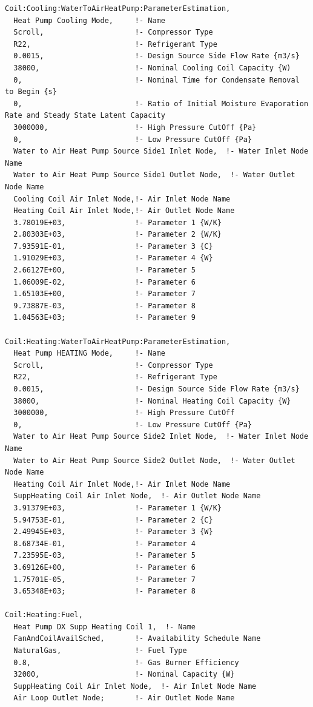 \begin{lstlisting}
Coil:Cooling:WaterToAirHeatPump:ParameterEstimation,
  Heat Pump Cooling Mode,     !- Name
  Scroll,                     !- Compressor Type
  R22,                        !- Refrigerant Type
  0.0015,                     !- Design Source Side Flow Rate {m3/s}
  38000,                      !- Nominal Cooling Coil Capacity {W)
  0,                          !- Nominal Time for Condensate Removal to Begin {s}
  0,                          !- Ratio of Initial Moisture Evaporation Rate and Steady State Latent Capacity
  3000000,                    !- High Pressure CutOff {Pa}
  0,                          !- Low Pressure CutOff {Pa}
  Water to Air Heat Pump Source Side1 Inlet Node,  !- Water Inlet Node Name
  Water to Air Heat Pump Source Side1 Outlet Node,  !- Water Outlet Node Name
  Cooling Coil Air Inlet Node,!- Air Inlet Node Name
  Heating Coil Air Inlet Node,!- Air Outlet Node Name
  3.78019E+03,                !- Parameter 1 {W/K}
  2.80303E+03,                !- Parameter 2 {W/K}
  7.93591E-01,                !- Parameter 3 {C}
  1.91029E+03,                !- Parameter 4 {W}
  2.66127E+00,                !- Parameter 5
  1.06009E-02,                !- Parameter 6
  1.65103E+00,                !- Parameter 7
  9.73887E-03,                !- Parameter 8
  1.04563E+03;                !- Parameter 9

Coil:Heating:WaterToAirHeatPump:ParameterEstimation,
  Heat Pump HEATING Mode,     !- Name
  Scroll,                     !- Compressor Type
  R22,                        !- Refrigerant Type
  0.0015,                     !- Design Source Side Flow Rate {m3/s}
  38000,                      !- Nominal Heating Coil Capacity {W}
  3000000,                    !- High Pressure CutOff
  0,                          !- Low Pressure CutOff {Pa}
  Water to Air Heat Pump Source Side2 Inlet Node,  !- Water Inlet Node Name
  Water to Air Heat Pump Source Side2 Outlet Node,  !- Water Outlet Node Name
  Heating Coil Air Inlet Node,!- Air Inlet Node Name
  SuppHeating Coil Air Inlet Node,  !- Air Outlet Node Name
  3.91379E+03,                !- Parameter 1 {W/K}
  5.94753E-01,                !- Parameter 2 {C}
  2.49945E+03,                !- Parameter 3 {W}
  8.68734E-01,                !- Parameter 4
  7.23595E-03,                !- Parameter 5
  3.69126E+00,                !- Parameter 6
  1.75701E-05,                !- Parameter 7
  3.65348E+03;                !- Parameter 8

Coil:Heating:Fuel,
  Heat Pump DX Supp Heating Coil 1,  !- Name
  FanAndCoilAvailSched,       !- Availability Schedule Name
  NaturalGas,                 !- Fuel Type
  0.8,                        !- Gas Burner Efficiency
  32000,                      !- Nominal Capacity {W}
  SuppHeating Coil Air Inlet Node,  !- Air Inlet Node Name
  Air Loop Outlet Node;       !- Air Outlet Node Name


\end{lstlisting}
